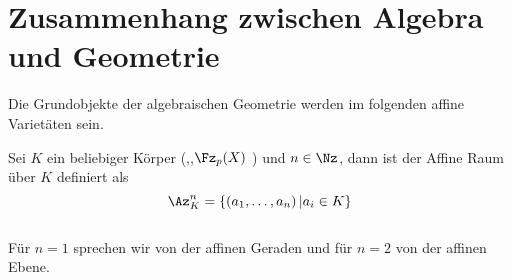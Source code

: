 \section{Zusammenhang zwischen Algebra und Geometrie} 
\subtitle{Ansatz aus Sicht der algebraischen Geometrie}
Die Grundobjekte der algebraischen Geometrie werden im folgenden affine Variet\"aten sein. \\
\begin{defn}
Sei \( K \) ein beliebiger K\"orper (\zB \Rz ,\Cz,\( \Fz_p(X) \) ) und \( n \in \Nz  \), dann ist der Affine Raum \"uber \( K \) definiert als 
\[ \Az^n_K = \left\lbrace \left( a_1, \dots , a_n \right) \vert a_i \in K \right\rbrace \] \\
F\"ur \(n=1 \) sprechen wir von der affinen Geraden und f\"ur \(n=2 \) von der affinen Ebene.
\end{defn}
